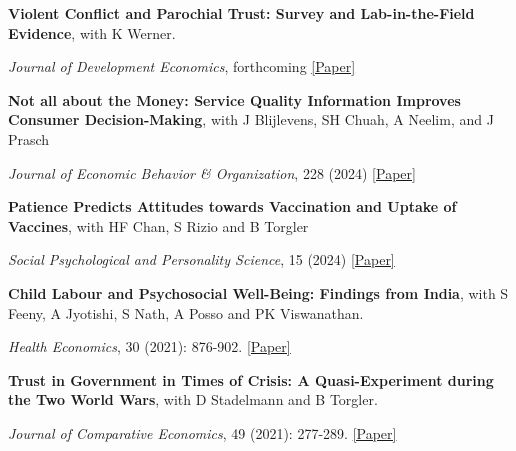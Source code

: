\documentclass[letterpaper]{article}
\renewenvironment{itemize}{
  \begin{list}{}{
    \setlength{\leftmargin}{1.5em}
  }
}{
  \end{list}
}
\begin{document}
\begin{itemize}


		\item \textbf{Violent Conflict and Parochial Trust: Survey and Lab-in-the-Field Evidence}, with K Werner. 
	\vspace{-0.05in}
							\item \textit{Journal of Development Economics}, forthcoming \href{https://papers.ssrn.com/sol3/papers.cfm?abstract_id=4294035}{[Paper]}
	\medskip

\item \textbf{Not all about the Money: Service Quality Information Improves Consumer Decision-Making}, with J Blijlevens, SH Chuah, A Neelim, and J Prasch
			\vspace{-0.05in}
\item \textit{Journal of Economic Behavior \& Organization}, 228 (2024) \href{https://www.sciencedirect.com/science/article/pii/S0167268124003834}{[Paper]}


\medskip

			\item {\bf Patience Predicts Attitudes towards Vaccination and Uptake of Vaccines}, with HF Chan, S Rizio and B Torgler
 			\vspace{-0.05in}
	\item \textit{Social Psychological and Personality Science}, 15 (2024) \href{https://journals.sagepub.com/doi/full/10.1177/19485506231189905/}{[Paper]}

\medskip
	
			\item \textbf{Child Labour and Psychosocial Well-Being: Findings from India}, with S Feeny, A Jyotishi, S Nath, A Posso and PK Viswanathan. 

	\vspace{-0.05in}
	
		\item \textit{Health Economics}, 30 (2021): 876-902. \href{https://drive.google.com/file/d/1I9yWtV-pGuyV0i0fq94jGkzt6pMkHtGl/view?usp=sharing}{[Paper]}
	
	\medskip
	
			\item {\bf Trust in Government in Times of Crisis:
		A Quasi-Experiment during the Two World Wars}, with  D Stadelmann and B Torgler. 
	
	\vspace{-0.05in}

		\item \textit{Journal of Comparative Economics}, 49 (2021): 277-289.  \href{http://www.crema-research.ch/papers/2019-04.pdf}{[Paper]} 


\end{itemize}
\end{document}
